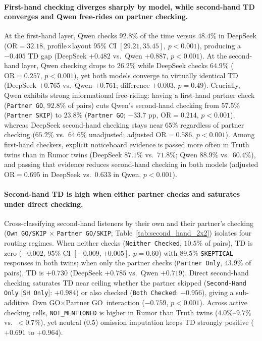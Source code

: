 \paragraph{First-hand checking diverges sharply by model, while second-hand TD converges and Qwen free-rides on partner checking.}
At the first-hand layer, Qwen checks $92.8\%$ of the time versus $48.4\%$ in DeepSeek ($\text{OR} = 32.18$, profile$\times$layout 95\% CI $[29.21, 35.45]$, $p < 0.001$), producing a $-0.405$ TD gap (DeepSeek $+0.482$ vs.\ Qwen $+0.887$, $p < 0.001$). At the second-hand layer, Qwen checking drops to $26.2\%$ while DeepSeek checks $64.9\%$ ($\text{OR} = 0.257$, $p < 0.001$), yet both models converge to virtually identical TD (DeepSeek $+0.765$ vs.\ Qwen $+0.761$; difference $+0.003$, $p = 0.49$). Crucially, Qwen exhibits strong informational free-riding: having a first-hand partner check (\texttt{Partner GO}, $92.8\%$ of pairs) cuts Qwen's second-hand checking from $57.5\%$ (\texttt{Partner SKIP}) to $23.8\%$ (\texttt{Partner GO}; $-33.7\text{ pp}$, $\text{OR} = 0.214$, $p < 0.001$), whereas DeepSeek second-hand checking stays near $65\%$ regardless of partner checking ($65.2\%$ vs.\ $64.6\%$ unadjusted; adjusted $\text{OR} = 0.586$, $p < 0.001$). Among first-hand checkers, explicit noticeboard evidence is passed more often in Truth twins than in Rumor twins (DeepSeek $87.1\%$ vs.\ $71.8\%$; Qwen $88.9\%$ vs.\ $60.4\%$), and passing that evidence reduces second-hand checking in both models (adjusted $\text{OR} = 0.695$ in DeepSeek vs.\ $0.633$ in Qwen, $p < 0.001$).

\paragraph{Second-hand TD is high when either partner checks and saturates under direct checking.}
Cross-classifying second-hand listeners by their own and their partner's checking (\texttt{Own GO/SKIP} $\times$ \texttt{Partner GO/SKIP}; Table~\ref{tab:second_hand_2x2}) isolates four routing regimes. When neither checks (\texttt{Neither Checked}, $10.5\%$ of pairs), TD is zero ($-0.002$, 95\% CI $[-0.009, +0.005]$, $p = 0.60$) with $89.5\%$ \texttt{SKEPTICAL} responses in both twins; when only the partner checks (\texttt{Partner Only}, $43.9\%$ of pairs), TD is $+0.730$ (DeepSeek $+0.785$ vs.\ Qwen $+0.719$). Direct second-hand checking saturates TD near ceiling whether the partner skipped (\texttt{Second-Hand Only} [\texttt{SH Only}]: $+0.984$) or also checked (\texttt{Both Checked}: $+0.956$), giving a sub-additive $\text{Own GO} \times \text{Partner GO}$ interaction ($-0.759$, $p < 0.001$). Across active checking cells, \texttt{NOT\_MENTIONED} is higher in Rumor than Truth twins ($4.0\%\text{--}9.7\%$ vs.\ $<0.7\%$), yet neutral ($0.5$) omission imputation keeps TD strongly positive ($+0.691$ to $+0.964$).


